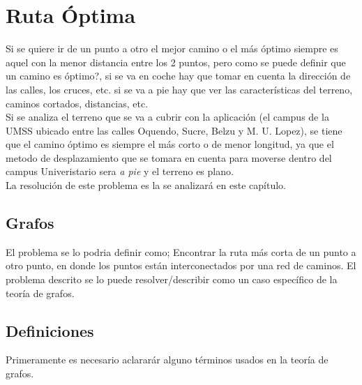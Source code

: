 \section{Ruta Óptima} %
\label{sec:ruta_optima}

Si se quiere ir de un punto a otro el mejor camino o el más óptimo siempre es aquel con la menor distancia entre los 2 puntos, pero como se puede definir que un camino es óptimo?, si se va en coche hay que tomar en cuenta la dirección de las calles, los cruces, etc. si se va a pie hay que ver las características del terreno, caminos cortados, distancias, etc.\\


Si se analiza el terreno que se va a cubrir con la aplicación (el campus de la UMSS ubicado entre las calles Oquendo, Sucre,  Belzu y M. U. Lopez), se tiene que el camino óptimo es siempre el más corto o de menor longitud, ya que el metodo de desplazamiento que se tomara en cuenta para moverse dentro del campus Univeristario sera \emph{a pie} y el terreno es plano.\\


La resolución de este problema es la se analizará en este capítulo.


  \subsection{Grafos} %
  \label{sub:teoria_grafos}

    El problema se lo podria definir como; Encontrar la ruta más corta de un punto a otro punto, en donde los puntos están interconectados por una red de caminos. El problema descrito se lo puede resolver/describir como un caso espec\'ifico de la teoría de grafos.


    \subsection{Definiciones} %
    \label{sub:grafos_definiciones}
      Primeramente es necesario aclarar\'ar alguno términos usados en la teoría de grafos.\\



